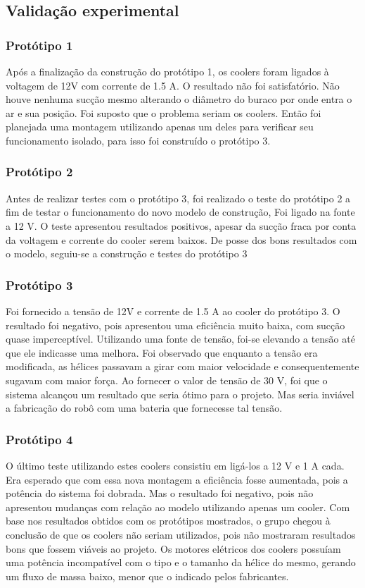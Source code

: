 \subsection{Validação experimental} %
	\label{sub:validação_experimental}

\subsubsection{Protótipo 1}
Após a finalização da construção do protótipo 1, os coolers foram ligados à voltagem de 12V com corrente de 1.5 A. O resultado não foi satisfatório. Não houve nenhuma sucção mesmo alterando o diâmetro do buraco por onde entra o ar e sua posição. Foi suposto que o problema seriam os coolers. Então foi planejada uma montagem utilizando apenas um deles para verificar seu funcionamento isolado, para isso foi construído o protótipo 3. 

\subsubsection{Protótipo 2}
Antes de realizar testes com o protótipo 3, foi realizado o teste do protótipo 2 a fim de testar o funcionamento do novo modelo de construção, Foi ligado na fonte a 12 V. O teste apresentou resultados positivos, apesar da sucção fraca por conta da voltagem e corrente do cooler serem baixos. De posse dos bons resultados com o modelo, seguiu-se a construção e testes do protótipo 3

\subsubsection{Protótipo 3}
Foi fornecido a tensão de 12V e corrente de 1.5 A ao cooler do protótipo 3. O resultado foi negativo, pois apresentou uma eficiência muito baixa, com sucção quase imperceptível. Utilizando uma fonte de tensão, foi-se elevando a tensão até que ele indicasse uma melhora. Foi observado que enquanto a tensão era modificada, as hélices passavam a girar com maior velocidade e consequentemente sugavam com maior força. Ao fornecer o valor de tensão de 30 V, foi que o sistema alcançou um resultado que seria ótimo para o projeto. Mas seria inviável a fabricação do robô com uma bateria que fornecesse tal tensão.

\subsubsection{Protótipo 4}    
O último teste utilizando estes coolers consistiu em ligá-los a 12 V e 1 A cada. Era esperado que com essa nova montagem a eficiência fosse aumentada, pois a potência do sistema foi dobrada. Mas o resultado foi negativo, pois não apresentou mudanças com relação ao modelo utilizando apenas um cooler. Com base nos resultados obtidos com os protótipos mostrados, o grupo chegou à conclusão de que os coolers não seriam utilizados, pois não mostraram resultados bons que fossem viáveis ao projeto. Os motores elétricos dos coolers possuíam uma potência incompatível com o tipo e o tamanho da hélice do mesmo, gerando um fluxo de massa baixo, menor que o indicado pelos fabricantes. 

